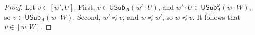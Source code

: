 \documentclass{article}
\def\QQ{\mathbb{Q}}
\def\RR{\mathbb{R}}
\def\F{\mathcal{F}}
\newcommand{\NN}[0]{\mathbb{N}}
\newcommand{\USub}{\mathsf{USub}}
\newcommand{\SubW}{\mathsf{Sub}}
\numberwithin{theorem}{section}
\newtheorem{lemma}[theorem]{Lemma}
\theoremstyle{definition}
\begin{document}
\begin{proof}
Let $v \in [w', U]$. First, $v \in \USub_{A}(w' \cdot U)$, and $w' \cdot U \in \USub^\omega_{A}(w \cdot W)$, so $v \in \USub_{A}(w \cdot W)$. Second, $w' \preceq v$, and $w \preceq w'$, so $w \preceq v$. It follows that $v \in [w, W]$.
\end{proof}







\end{document}
